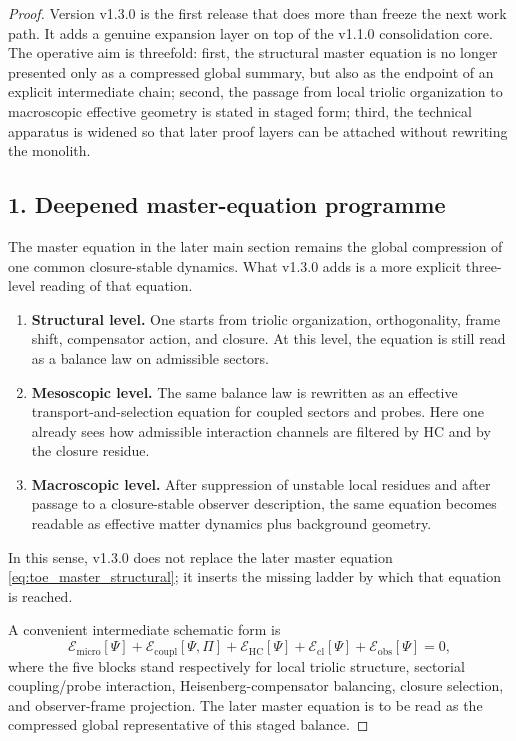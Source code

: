 \begin{proof}
Version v1.3.0 is the first release that does more than freeze the next
work path. It adds a genuine expansion layer on top of the v1.1.0
consolidation core. The operative aim is threefold: first, the structural
master equation is no longer presented only as a compressed global summary, but
also as the endpoint of an explicit intermediate chain; second, the passage
from local triolic organization to macroscopic effective geometry is stated in
staged form; third, the technical apparatus is widened so that later proof
layers can be attached without rewriting the monolith.

\subsection*{1. Deepened master-equation programme}
The master equation in the later main section remains the global compression of
one common closure-stable dynamics. What v1.3.0 adds is a more explicit
three-level reading of that equation.
\begin{enumerate}[leftmargin=2em,label=(\roman*)]
  \item \textbf{Structural level.} One starts from triolic organization,
  orthogonality, frame shift, compensator action, and closure. At this level,
  the equation is still read as a balance law on admissible sectors.
  \item \textbf{Mesoscopic level.} The same balance law is rewritten as an
  effective transport-and-selection equation for coupled sectors and probes.
  Here one already sees how admissible interaction channels are filtered by HC
  and by the closure residue.
  \item \textbf{Macroscopic level.} After suppression of unstable local
  residues and after passage to a closure-stable observer description, the same
  equation becomes readable as effective matter dynamics plus background
  geometry.
\end{enumerate}
In this sense, v1.3.0 does not replace the later master equation
\eqref{eq:toe_master_structural}; it inserts the missing ladder by which that
equation is reached.

A convenient intermediate schematic form is
\[
\mathcal E_{\mathrm{micro}}[\Psi]
+\mathcal E_{\mathrm{coupl}}[\Psi,\Pi]
+\mathcal E_{\mathrm{HC}}[\Psi]
+\mathcal E_{\mathrm{cl}}[\Psi]
+\mathcal E_{\mathrm{obs}}[\Psi]
=0,
\]
where the five blocks stand respectively for local triolic structure, sectorial
coupling/probe interaction, Heisenberg-compensator balancing, closure
selection, and observer-frame projection. The later master equation is to be
read as the compressed global representative of this staged balance.


\end{proof}
